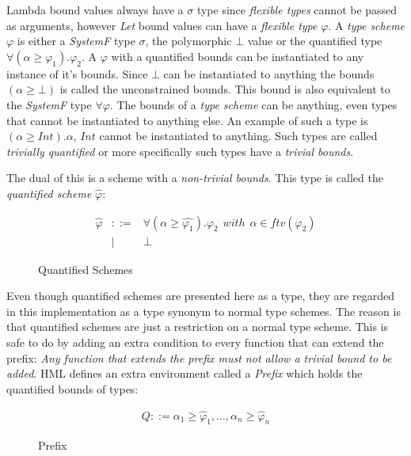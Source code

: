 Lambda bound values always have a $\sigma$ type since \emph{flexible types} cannot be passed as arguments, however \emph{Let} bound values can have a \emph{flexible type} $\varphi$.
A \emph{type scheme} $\varphi$ is either a \emph{SystemF} type $\sigma$, the polymorphic $\bot$ value or the quantified type $\forall (\alpha \geq \varphi_1). \varphi_2$. A $\varphi$ with a quantified bounds can be instantiated to any instance of it's bounds. Since $\bot$ can be instantiated to anything the bounds $(\alpha \geq \bot)$ is called the unconstrained bounds. This bound is also equivalent to the \emph{SystemF} type $\forall \varphi$. The bounds of a \emph{type scheme} can be anything, even types that cannot be instantiated to anything else. An example of such a type is $(\alpha \geq Int).\alpha$, $Int$ cannot be instantiated to anything. Such types are called \emph{trivially quantified} or more specifically such types have a \emph{trivial bounds}.

The dual of this is a scheme with a \emph{non-trivial bounds}. This type is called the \emph{quantified scheme} $\hat{\varphi}$:

\begin{figure}[H]
\begin{eqnarray*}
\hat{\varphi} & ::= & \forall (\alpha \geq \hat{\varphi_1}). \varphi_2 \hspace{5pt} with \hspace{5pt} \alpha \in ftv(\varphi_2) \\
              & | & \bot
\end{eqnarray*}
\caption{Quantified Schemes}
\label{quantified-schemes}
\end{figure}

Even though quantified schemes are presented here as a type, they are regarded in this implementation as a type synonym to normal type schemes. The reason is that quantified schemes are just a restriction on a normal type scheme. This is safe to do by adding an extra condition to every function that can extend the prefix: \emph{Any function that extends the prefix must not allow a trivial bound to be added}.
HML defines an extra environment called a \emph{Prefix} which holds the quantified bounds of types:

\begin{figure}[H]
\begin{eqnarray*}
Q ::= \alpha_1\geq\hat{\varphi}_1,\ldots,\alpha_n\geq\hat{\varphi}_n
\end{eqnarray*}
\caption{Prefix}
\label{Prefix}
\end{figure}

